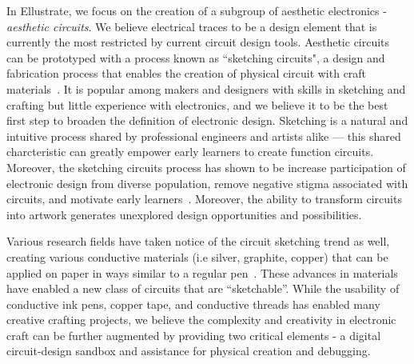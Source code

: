 \documentclass{sigchi}
\begin{document}
In Ellustrate, we focus on the creation of a subgroup of aesthetic electronics - \textit{aesthetic circuits}. We believe electrical traces to be a design element that is currently the most restricted by current circuit design tools. Aesthetic circuits can be prototyped with a process known as ``sketching circuits", a design and fabrication process that enables the creation of physical circuit with craft materials~\cite{qi_sketching_2014}. It is popular among makers and designers with skills in sketching and crafting but little experience with electronics, and we believe it to be the best first step to broaden the definition of electronic design. Sketching is a natural and intuitive process shared by professional engineers and artists alike --- this shared charcteristic can greatly empower early learners to create function circuits. Moreover, the sketching circuits process has shown to be increase participation of electronic design from diverse population, remove negative stigma associated with circuits, and motivate early learners~\cite{qi_stickers_2015}. Moreover, the ability to transform circuits into artwork generates unexplored design opportunities and possibilities. 


Various research fields have taken notice of the circuit sketching trend as well, creating various conductive materials (i.e silver, graphite, copper) that can be applied on paper in ways similar to a regular pen~\cite{russo2011pen,Anonymous:ojhPyGTN}. These advances in materials have enabled a new class of circuits that are ``sketchable''. While the usability of conductive ink pens, copper tape, and conductive threads has enabled many creative crafting projects, we believe the complexity and creativity in electronic craft can be further augmented by providing two critical elements - a digital circuit-design sandbox and assistance for physical creation and debugging. 
\end{document}
